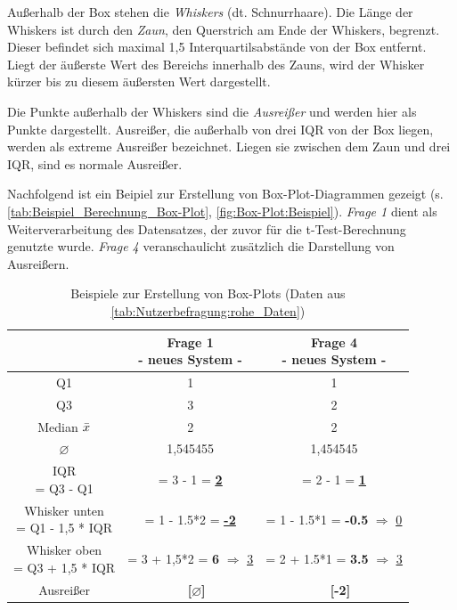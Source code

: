 Außerhalb der Box stehen die \textit{Whiskers} (dt. Schnurrhaare). Die Länge der Whiskers ist durch den \textit{Zaun}, den Querstrich am Ende der Whiskers, begrenzt. Dieser befindet sich maximal 1,5 Interquartilsabstände von der Box entfernt. Liegt der äußerste Wert des Bereichs innerhalb des Zauns, wird der Whisker kürzer bis zu diesem äußersten Wert dargestellt.

Die Punkte außerhalb der Whiskers sind die \textit{Ausreißer} und werden hier als Punkte dargestellt. Ausreißer, die außerhalb von drei IQR von der Box liegen, werden als extreme Ausreißer bezeichnet. Liegen sie zwischen dem Zaun und drei IQR, sind es normale Ausreißer.

Nachfolgend ist ein Beipiel zur Erstellung von Box-Plot-Diagrammen gezeigt (s. \autoref{tab:Beispiel_Berechnung_Box-Plot}, \autoref{fig:Box-Plot:Beispiel}). \textit{Frage 1} dient als Weiterverarbeitung des Datensatzes, der zuvor für die t-Test-Berechnung genutzte wurde. \textit{Frage 4} veranschaulicht zusätzlich die Darstellung von Ausreißern.

\begin{table}[H]
    \centering
    \begin{tabular}{|c|c|c|}
        \hline
                         & \makecell{\textbf{Frage 1}\\- neues System -}
                         & \makecell{\textbf{Frage 4}\\- neues System -} \\ \hline
        Q1               & 1 & 1 \\ \hline
        Q3               & 3 & 2 \\ \hline
        Median $\Bar{x}$ & 2 & 2 \\ \hline
        $\varnothing$    & 1,545455 & 1,454545 \\ \hline
        \makecell{IQR\\= Q3 - Q1}
                         & = 3 - 1 = \underline{\underline{\textbf{2}}}
                         & = 2 - 1 = \underline{\underline{\textbf{1}}} \\ \hline
        \makecell{Whisker unten\\= Q1 - 1,5 * IQR}
                         & = 1 - 1.5*2 = \underline{\underline{\textbf{-2}}} 
                         & = 1 - 1.5*1 = \textbf{-0.5} $\Rightarrow$ \underline{\underline{0}} \\ \hline
        \makecell{Whisker oben\\= Q3 + 1,5 * IQR}
                         & = 3 + 1,5*2 = \textbf{6} $\Rightarrow$ \underline{\underline{3}}
                         & = 2 + 1.5*1 = \textbf{3.5} $\Rightarrow$ \underline{\underline{3}} \\ \hline
        Ausreißer        & ~~\textbf{[$\varnothing$]}
                         & ~~\textbf{[-2]} \\ \hline
    \end{tabular}
    \caption{Beispiele zur Erstellung von Box-Plots (Daten aus \autoref{tab:Nutzerbefragung:rohe_Daten})}
    \label{tab:Beispiel_Berechnung_Box-Plot}
\end{table}

